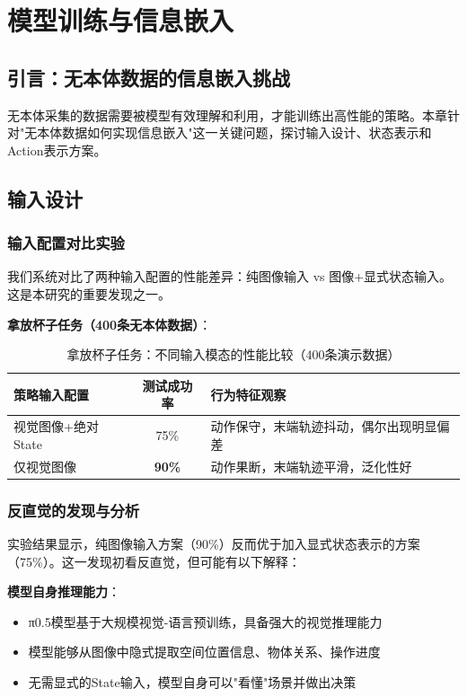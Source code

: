 \section{模型训练与信息嵌入}

\subsection{引言：无本体数据的信息嵌入挑战}

无本体采集的数据需要被模型有效理解和利用，才能训练出高性能的策略。本章针对"无本体数据如何实现信息嵌入"这一关键问题，探讨输入设计、状态表示和Action表示方案。

\subsection{输入设计}

\subsubsection{输入配置对比实验}

我们系统对比了两种输入配置的性能差异：纯图像输入 vs 图像+显式状态输入。这是本研究的重要发现之一。

\textbf{拿放杯子任务（400条无本体数据）}：

\begin{table}[htbp]
\centering
\caption{拿放杯子任务：不同输入模态的性能比较（400条演示数据）}
\label{tab:input_comparison}
\begin{tabular}{lcp{6cm}}
\toprule
策略输入配置 & 测试成功率 & 行为特征观察 \\
\midrule
视觉图像+绝对State & 75\% & 动作保守，末端轨迹抖动，偶尔出现明显偏差 \\
仅视觉图像 & \textbf{90\%} & 动作果断，末端轨迹平滑，泛化性好 \\
\bottomrule
\end{tabular}
\end{table}

\subsubsection{反直觉的发现与分析}

实验结果显示，纯图像输入方案（90\%）反而优于加入显式状态表示的方案（75\%）。这一发现初看反直觉，但可能有以下解释：

\textbf{模型自身推理能力}：
\begin{itemize}[leftmargin=2em]
    \item π0.5模型基于大规模视觉-语言预训练，具备强大的视觉推理能力
    \item 模型能够从图像中隐式提取空间位置信息、物体关系、操作进度
    \item 无需显式的State输入，模型自身可以"看懂"场景并做出决策
\end{itemize}

